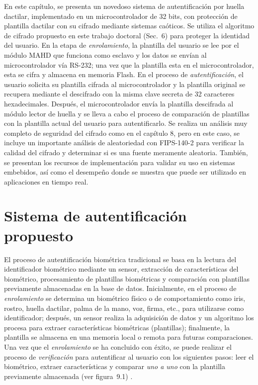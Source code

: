 En este capítulo, se presenta un novedoso sistema de autentificación por huella dactilar, implementado en un microcontrolador de 32 bits, con protección de plantilla dactilar con su cifrado mediante sistemas caóticos. Se utiliza el algoritmo de cifrado propuesto en este trabajo doctoral (Sec.~6) para proteger la identidad del usuario. En la etapa de \textit{enrolamiento}, la plantilla del usuario se lee por el módulo MAHD que funciona como esclavo y    los datos se envían al microcontrolador vía RS-232; una vez que la plantilla esta en el microcontrolador, esta se cifra y almacena en memoria Flash. En el proceso de \textit{autentificación}, el usuario solicita su plantilla cifrada al microcontrolador y la plantilla original se recupera mediante el descifrado con la misma clave secreta de 32 caracteres hexadecimales. Después, el microcontrolador envía la plantilla descifrada al módulo lector de huella y se lleva a cabo el proceso de comparación de plantillas con la plantilla actual del usuario para autentificarlo. Se realiza un análisis muy completo de seguridad del cifrado como en el capítulo 8, pero en este caso, se incluye un importante análisis de aleatoriedad con FIPS-140-2 para verificar la calidad del cifrado y determinar si es una fuente meramente aleatoria. También, se presentan los recursos de implementación para validar su uso en sistemas embebidos, así como el desempeño donde se muestra que puede ser utilizado en aplicaciones en tiempo real.

\section{Sistema de autentificación propuesto}
El proceso de autentificación biométrica tradicional se basa en la lectura del identificador biométrico mediante un sensor, extracción de características del biométrico, procesamiento de plantillas biométricas y comparación con plantillas previamente almacenadas en la base de datos. Inicialmente, en el proceso de \textit{enrolamiento} se determina un biométrico físico o de comportamiento como iris, rostro, huella dactilar, palma de la mano, voz, firma, etc., para utilizarse como identificador; después, un sensor realiza la adquisición de datos y un algoritmo los procesa para extraer características biométricas (plantillas); finalmente, la plantilla se almacena en una memoria local o remota para futuras comparaciones. Una vez que el \textit{enrolamiento} se ha concluido con éxito, se puede realizar el proceso de \textit{verificación} para autentificar al usuario con los siguientes pasos: leer el biométrico, extraer características y comparar \textit{uno a uno} con la plantilla previamente almacenada (ver figura~9.1) \cite{LGEtAl_2003}.   \\         

